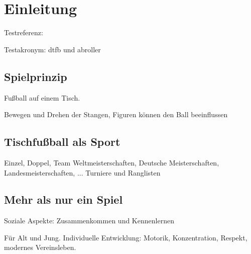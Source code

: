 \chapter{Einleitung}

Testreferenz: \cite{ehring2010}

Testakronym: \gls{dtfb} und \gls{abroller}

\section{Spielprinzip}

Fußball auf einem Tisch.

Bewegen und Drehen der Stangen, Figuren können den Ball beeinflussen

\section{Tischfußball als Sport}

Einzel, Doppel, Team
Weltmeisterschaften, Deutsche Meisterschaften, Landesmeisterschaften, ...
Turniere und Ranglisten

\section{Mehr als nur ein Spiel}

Soziale Aspekte: Zusammenkommen und Kennenlernen

Für Alt und Jung. Individuelle Entwicklung: Motorik, Konzentration, Respekt, modernes Vereinsleben.


